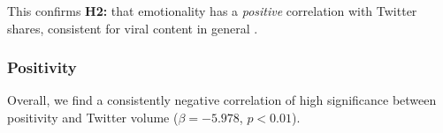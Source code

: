 \documentclass[letterpaper]{article}
\begin{document}


This confirms \textbf{H2:} that emotionality has a \emph{positive} correlation with Twitter shares, consistent for viral content in general \cite{berger2012makes}.

 
\subsubsection{Positivity}
Overall, we find a consistently negative correlation of high significance between positivity and Twitter volume ($\beta=−5.978$, $p<0.01$). 
 
\end{document}
